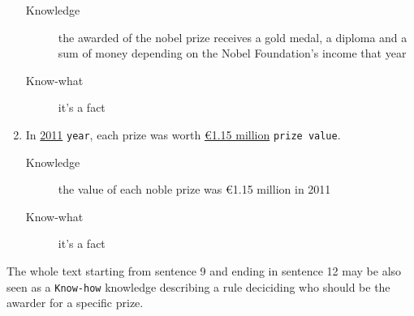 \documentclass[a4paper,10pt,twoside,twocolumn]{article}
\begin{document}
\begin{enumerate}
\begin{description}
\item[{Knowledge}] the awarded of the nobel prize receives a gold medal, a diploma and a sum of money depending on the Nobel Foundation's income that year
\item[{Know-what}] it's a fact
\end{description}
\item In \uline{2011} \texttt{year}, each prize was worth \uline{€1.15 million} \texttt{prize value}.
\begin{description}
\item[{Knowledge}] the value of each noble prize was €1.15 million in 2011
\item[{Know-what}] it's a fact
\end{description}
\end{enumerate}

The whole text starting from sentence 9 and ending in sentence 12 may be also seen as a \texttt{Know-how} knowledge describing a rule deciciding who should be the awarder for a specific prize.
\end{document}
